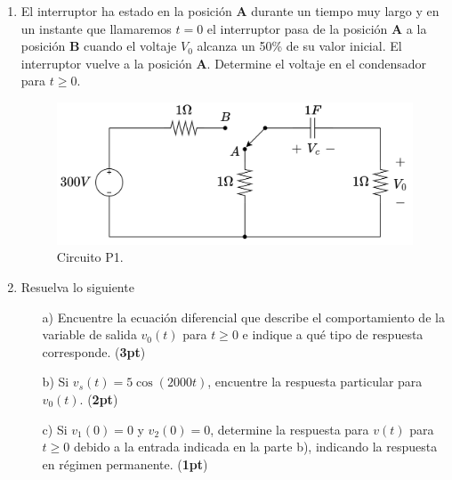 \documentclass[
	spanish, %
	letterpaper, oneside
]{article}
\begin{document}
\templatePagecfg

\begin{enumerate}
    \item El interruptor ha estado en la posición \textbf{A} durante un tiempo muy largo y en un instante que llamaremos \( t=0 \) el interruptor pasa de la posición \textbf{A} a la posición \textbf{B} cuando el voltaje \( V_0 \) alcanza un 50\% de su valor inicial. El interruptor vuelve a la posición \textbf{A}. Determine el voltaje en el condensador para \( t \geq 0 \).

    \begin{figure}
        \centering
        \includegraphics[width=0.6\linewidth]{img/P11.png}
        \caption{Circuito P1.}
        \label{fig:p1}
    \end{figure}
    \item Resuelva lo siguiente
\begin{enumerate}
    \item[a)] Encuentre la ecuación diferencial que describe el comportamiento de la variable de salida \( v_0(t) \) para \( t \geq 0 \) e indique a qué tipo de respuesta corresponde.  (\textbf{3pt})
    
    \item[b)] Si \( v_s(t) = 5\cos(2000t) \), encuentre la respuesta particular para \( v_0(t) \).  (\textbf{2pt})
    
    \item[c)] Si \( v_1(0) = 0 \) y \( v_2(0) = 0 \), determine la respuesta para \( v(t) \) para \( t \geq 0 \) debido a la entrada indicada en la parte b), indicando la respuesta en régimen permanente.  (\textbf{1pt})
\end{enumerate}


\end{enumerate}
\end{document}
